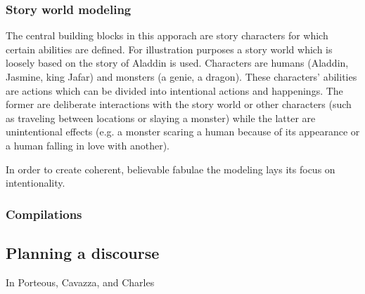 \subsubsection{Story world modeling}
The central building blocks in this apporach are story characters for which certain abilities are defined. For illustration purposes a story world which is loosely based on the story of Aladdin is used. Characters are humans (Aladdin, Jasmine, king Jafar) and monsters (a genie, a dragon). These characters' abilities are actions which can be divided into intentional actions and happenings. The former are deliberate interactions with the story world or other characters (such as traveling between locations or slaying a monster) while the latter are unintentional effects (e.g. a monster scaring a human because of its appearance or a human falling in love with another).

In order to create coherent, believable fabulae the modeling lays its focus on intentionality.
\subsubsection{Compilations}
\subsection{Planning a discourse}\label{discourse}
In \cite{Porteous10} Porteous, Cavazza, and Charles

